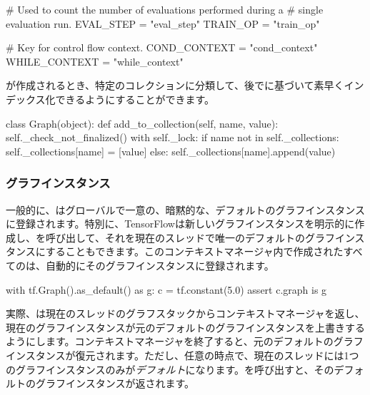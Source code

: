 \begin{content}
\begin{leftbar}
\begin{python}
  # Used to count the number of evaluations performed during a 
  # single evaluation run.
  EVAL_STEP = "eval_step"
  TRAIN_OP = "train_op"

  # Key for control flow context.
  COND_CONTEXT = "cond_context"
  WHILE_CONTEXT = "while_context"
\end{python}
\end{leftbar}

が作成されるとき、特定のコレクションに分類して、後でに基づいて素早くインデックス化できるようにすることができます。

\begin{leftbar}
\begin{python}
class Graph(object):
  def add_to_collection(self, name, value):
    self._check_not_finalized()
    with self._lock:
      if name not in self._collections:
        self._collections[name] = [value]
      else:
        self._collections[name].append(value)
\end{python}
\end{leftbar}

\subsubsection{グラフインスタンス}

一般的に、はグローバルで一意の、暗黙的な、デフォルトのグラフインスタンスに登録されます。特別に、TensorFlowは新しいグラフインスタンスを明示的に作成し、を呼び出して、それを現在のスレッドで唯一のデフォルトのグラフインスタンスにすることもできます。このコンテキストマネージャ内で作成されたすべてのは、自動的にそのグラフインスタンスに登録されます。

\begin{leftbar}
\begin{python}
with tf.Graph().as_default() as g:
  c = tf.constant(5.0)
  assert c.graph is g
\end{python}
\end{leftbar}

実際、は現在のスレッドのグラフスタックからコンテキストマネージャを返し、現在のグラフインスタンスが元のデフォルトのグラフインスタンスを上書きするようにします。コンテキストマネージャを終了すると、元のデフォルトのグラフインスタンスが復元されます。ただし、任意の時点で、現在のスレッドには1つのグラフインスタンスのみが\emph{デフォルト}になります。を呼び出すと、そのデフォルトのグラフインスタンスが返されます。


\end{content}
